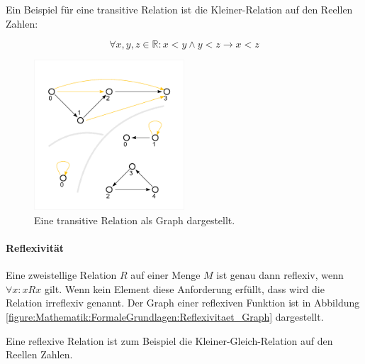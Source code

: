 \documentclass[../main.tex]{subfiles}
\begin{document}
                    Ein Beispiel für eine transitive Relation ist die Kleiner-Relation auf den Reellen Zahlen:
                    
                    \begin{equation}
                        \forall x, y, z \in \mathbb{R}\colon x < y \land y < z \rightarrow x < z
                    \end{equation}
                    
                    \begin{figure}
                         \centering
                         \includegraphics[width=0.5\textwidth]{Abbildungen/Transitivitaet_Graph.png}
                         \caption{Eine transitive Relation als Graph dargestellt.}
                         \label{figure:Mathematik:FormaleGrundlagen:Transitivitaet_Graph}
                    \end{figure}
                    
                \paragraph{Reflexivität}
                    Eine zweistellige Relation $R$ auf einer Menge $M$ ist genau dann reflexiv, wenn $\forall x\colon xRx$ gilt. Wenn kein Element diese Anforderung erfüllt, dass wird die Relation irreflexiv genannt. Der Graph einer reflexiven Funktion ist in Abbildung \ref{figure:Mathematik:FormaleGrundlagen:Reflexivitaet_Graph} dargestellt.
                    
                    Eine reflexive Relation ist zum Beispiel die Kleiner-Gleich-Relation auf den Reellen Zahlen.
                    
\end{document}
